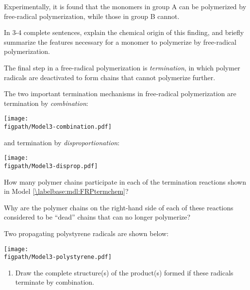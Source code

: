 \begin{activity}
\begin{ctqs}
			Experimentally, it is found that the monomers in group A can be polymerized by free-radical polymerization, while those in group B cannot.
	
		In 3-4 complete sentences, explain the chemical origin of this finding, and briefly summarize the features necessary for a monomer to polymerize by free-radical polymerization.
			
				\begin{solution}[2.5in]
				\end{solution}

\end{ctqs}


\begin{model}[Termination]
\label{\labelbase:mdl:FRPtermchem}

	The final step in a free-radical polymerization is \emph{termination}, in which polymer radicals are deactivated to form chains that cannot polymerize further.
	
	The two important termination mechanisms in free-radical polymerization are termination by \emph{combination}:
	
			\centerline{\texttt{[image: \\figpath/Model3-combination.pdf]}}
	
	and termination by \emph{disproportionation}:
	
			\centerline{\texttt{[image: \\figpath/Model3-disprop.pdf]}}

\end{model}

\begin{ctqs}

	\question How many polymer chains participate in each of the termination reactions shown in Model \ref{\labelbase:mdl:FRPtermchem}?
	
		\begin{solution}[0.5in]
		\end{solution}

	\question Why are the polymer chains on the right-hand side of each of these reactions considered to be ``dead'' chains that can no longer polymerize?
	
		\begin{solution}[1in]
		\end{solution}
	
	\question Two propagating polystyrene radicals are shown below:
	
			\centerline{\texttt{[image: \\figpath/Model3-polystyrene.pdf]}}
	
		\begin{enumerate}
			\item Draw the complete structure(s) of the product(s) formed if these radicals terminate by combination.
	

\end{enumerate}
\end{ctqs}
\end{activity}
